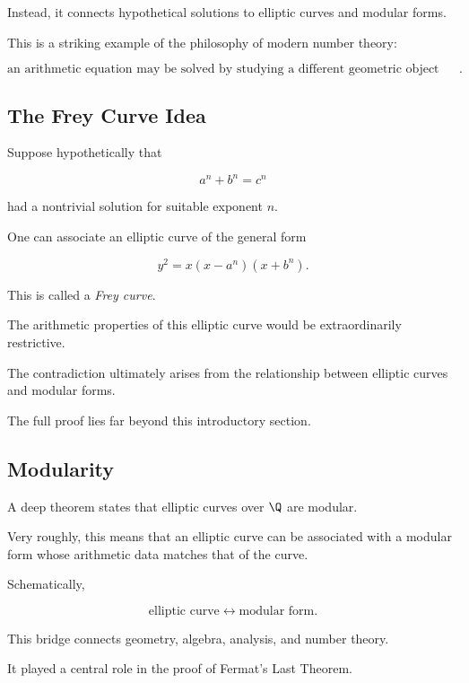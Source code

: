 Instead, it connects hypothetical solutions to elliptic curves and modular
forms.

This is a striking example of the philosophy of modern number theory:

\[
\boxed{
\text{an arithmetic equation may be solved by studying a different
geometric object associated with it}.
}
\]

\subsection{The Frey Curve Idea}
\label{subsec:frey-curve-idea}

Suppose hypothetically that

\[ a^n+b^n=c^n \]

had a nontrivial solution for suitable exponent \(n\).

One can associate an elliptic curve of the general form

\[ y^2=x(x-a^n)(x+b^n). \]

This is called a \emph{Frey curve}.

The arithmetic properties of this elliptic curve would be extraordinarily
restrictive.

The contradiction ultimately arises from the relationship between elliptic
curves and modular forms.

The full proof lies far beyond this introductory section.

\subsection{Modularity}
\label{subsec:elliptic-modularity-preview}

A deep theorem states that elliptic curves over \(\Q\) are modular.

Very roughly, this means that an elliptic curve can be associated with a
modular form whose arithmetic data matches that of the curve.

Schematically,

\[
\boxed{
\text{elliptic curve}
\longleftrightarrow
\text{modular form}.
}
\]

This bridge connects geometry, algebra, analysis, and number theory.

It played a central role in the proof of Fermat's Last Theorem.

